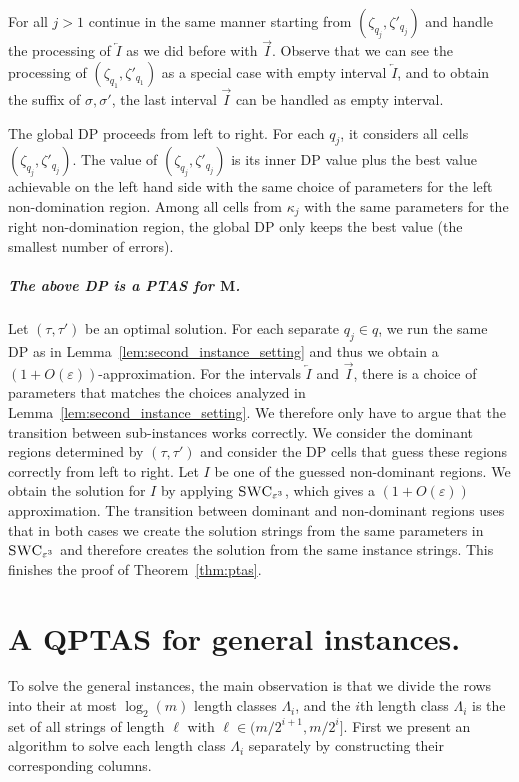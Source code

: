 For all $j > 1$ continue in the same manner starting from $(\zeta_{q_j},\zeta'_{q_j})$ and handle the processing of $\overleftarrow{I}$ as we did before with $\overrightarrow{I}$.
Observe that we can see the processing of $(\zeta_{q_1},\zeta'_{q_1})$ as a special case with empty interval $\overleftarrow{I}$, and to obtain the suffix of $\sigma,\sigma'$, the last interval $\overrightarrow{I}$ can be handled as empty interval.

The global DP proceeds from left to right. For each $q_j$, it considers all cells $(\zeta_{q_j},\zeta'_{q_j})$.
The value of $(\zeta_{q_j},\zeta'_{q_j})$ is its inner DP value plus the best value achievable on the left hand side with the same choice of parameters for the left non-domination region.
Among all cells from $\kappa_j$ with the same parameters for the right non-domination region, the global DP only keeps the best value (the smallest number of errors).

\subparagraph{The above DP is a PTAS for $\mathbf{M}$.} 
Let $(\tau,\tau')$ be an optimal solution.
For each separate $q_j \in q$, we run the same DP as in Lemma~\ref{lem:second_instance_setting} and thus we obtain a $(1+O(\varepsilon))$-approximation.
For the intervals $\overleftarrow{I}$ and $\overrightarrow{I}$, there is a choice of parameters that matches the choices analyzed in Lemma~\ref{lem:second_instance_setting}.
We therefore only have to argue that the transition between sub-instances works correctly.
We consider the dominant regions determined by $(\tau,\tau')$ and consider the DP cells that guess these regions correctly from left to right.
Let $I$ be one of the guessed non-dominant regions.
We obtain the solution for $I$ by applying $\textsc{SWC}_{\varepsilon^3}$, which gives a $(1+O(\varepsilon))$ approximation.
The transition between dominant and non-dominant regions uses that in both cases we create the solution strings from the same parameters in $\textsc{SWC}_{\varepsilon^3}$ and therefore creates the solution from the same instance strings.
This finishes the proof of Theorem~\ref{thm:ptas}.

\section{A QPTAS for general instances.}\label{sec:QPTAS}

To solve the general instances, the main observation is that we divide the rows into their at most $\log_2(m)$ length classes $\Lambda_i$, and the $i$th length class $\Lambda_i$ is the set of all strings of length $\ell$ with $\ell \in (m/2^{i+1}, m/2^{i}]$.
First we present an algorithm to solve each length class $\Lambda_i$ separately by constructing their corresponding columns.

